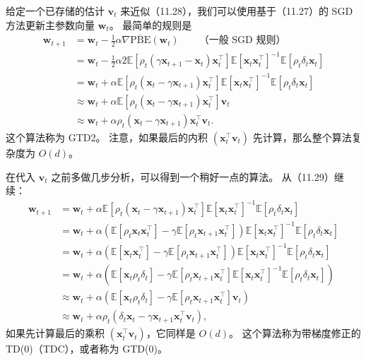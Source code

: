 \documentclass[UTF8, 12pt, fontset=fandol, oneside]{ctexart}
\begin{document}
给定一个已存储的估计 $\mathbf{v}_t$ 来近似（11.28），我们可以使用基于（11.27）的 SGD 方法更新主参数向量 $\mathbf{w}_t$。
最简单的规则是
\begin{equation}
\begin{aligned}
\mathbf{w}_{t+1}
&=\mathbf{w}_t-\frac{1}{2}\alpha\nabla\overline{\mathrm{PBE}}(\mathbf{w}_t) \qquad \text{（一般 SGD 规则）}\\
&=\mathbf{w}_t-\frac{1}{2}\alpha 2\mathbb{E}\left[\rho_t(\gamma\mathbf{x}_{t+1}-\mathbf{x}_t)\mathbf{x}_t^\top\right]\mathbb{E}\left[\mathbf{x}_t\mathbf{x}_t^\top\right]^{-1}\mathbb{E}\left[\rho_t\delta_t\mathbf{x}_t\right]\\
&=\mathbf{w}_t+\alpha\mathbb{E}\left[\rho_t(\mathbf{x}_t-\gamma\mathbf{x}_{t+1})\mathbf{x}_t^\top\right]\mathbb{E}\left[\mathbf{x}_t\mathbf{x}_t^\top\right]^{-1}\mathbb{E}\left[\rho_t\delta_t\mathbf{x}_t\right]\\
&\approx\mathbf{w}_t+\alpha\mathbb{E}\left[\rho_t(\mathbf{x}_t-\gamma\mathbf{x}_{t+1})\mathbf{x}_t^\top\right]\mathbf{v}_t\\
&\approx\mathbf{w}_t+\alpha\rho_t(\mathbf{x}_t-\gamma\mathbf{x}_{t+1})\mathbf{x}_t^\top\mathbf{v}_t .
\end{aligned}
\tag{11.29}
\end{equation}
这个算法称为 GTD2。
注意，如果最后的内积 $(\mathbf{x}_t^\top\mathbf{v}_t)$ 先计算，那么整个算法复杂度为 $O(d)$。

在代入 $\mathbf{v}_t$ 之前多做几步分析，可以得到一个稍好一点的算法。
从（11.29）继续：
\[
\begin{aligned}
\mathbf{w}_{t+1}
&=\mathbf{w}_t+\alpha\mathbb{E}\left[\rho_t(\mathbf{x}_t-\gamma\mathbf{x}_{t+1})\mathbf{x}_t^\top\right]\mathbb{E}\left[\mathbf{x}_t\mathbf{x}_t^\top\right]^{-1}\mathbb{E}\left[\rho_t\delta_t\mathbf{x}_t\right]\\
&=\mathbf{w}_t+\alpha\left(\mathbb{E}[\rho_t\mathbf{x}_t\mathbf{x}_t^\top]-\gamma\mathbb{E}[\rho_t\mathbf{x}_{t+1}\mathbf{x}_t^\top]\right)\mathbb{E}\left[\mathbf{x}_t\mathbf{x}_t^\top\right]^{-1}\mathbb{E}\left[\rho_t\delta_t\mathbf{x}_t\right]\\
&=\mathbf{w}_t+\alpha\left(\mathbb{E}[\mathbf{x}_t\mathbf{x}_t^\top]-\gamma\mathbb{E}[\rho_t\mathbf{x}_{t+1}\mathbf{x}_t^\top]\right)\mathbb{E}\left[\mathbf{x}_t\mathbf{x}_t^\top\right]^{-1}\mathbb{E}\left[\rho_t\delta_t\mathbf{x}_t\right]\\
&=\mathbf{w}_t+\alpha\left(\mathbb{E}[\mathbf{x}_t\rho_t\delta_t]-\gamma\mathbb{E}[\rho_t\mathbf{x}_{t+1}\mathbf{x}_t^\top]\mathbb{E}\left[\mathbf{x}_t\mathbf{x}_t^\top\right]^{-1}\mathbb{E}\left[\rho_t\delta_t\mathbf{x}_t\right]\right)\\
&\approx \mathbf{w}_t+\alpha\left(\mathbb{E}[\mathbf{x}_t\rho_t\delta_t]-\gamma\mathbb{E}[\rho_t\mathbf{x}_{t+1}\mathbf{x}_t^\top]\mathbf{v}_t\right)\\
&\approx \mathbf{w}_t+\alpha\rho_t\left(\delta_t\mathbf{x}_t-\gamma\mathbf{x}_{t+1}\mathbf{x}_t^\top\mathbf{v}_t\right),
\end{aligned}
\]
如果先计算最后的乘积 $(\mathbf{x}_t^\top\mathbf{v}_t)$，它同样是 $O(d)$。
这个算法称为带梯度修正的 TD(0)（TDC），或者称为 GTD(0)。
\end{document}
